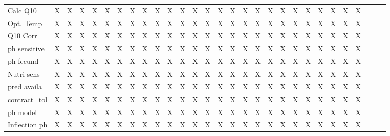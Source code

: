 \documentclass[11pt]{article}
\begin{document}
\begin{center}
\begin{tabular}{lllllllllllllllllllllllllllll}
 Calc Q10            &  X    &  X    &  X    &  X    &  X    &  X    &  X    &  X    &  X    &  X    &  X    &  X    &  X    &  X    &  X    &  X    &  X    &  X    &  X    &  X    &  X    &  X   &  X   &  X    &  X    &      &      &      \\
 Opt. Temp           &  X    &  X    &  X    &  X    &  X    &  X    &  X    &  X    &  X    &  X    &  X    &  X    &  X    &  X    &  X    &  X    &  X    &  X    &  X    &  X    &  X    &  X   &  X   &  X    &  X    &      &      &      \\
 Q10 Corr            &  X    &  X    &  X    &  X    &  X    &  X    &  X    &  X    &  X    &  X    &  X    &  X    &  X    &  X    &  X    &  X    &  X    &  X    &  X    &  X    &  X    &  X   &  X   &  X    &  X    &      &      &      \\
 ph sensitive        &  X    &  X    &  X    &  X    &  X    &  X    &  X    &  X    &  X    &  X    &  X    &  X    &  X    &  X    &  X    &  X    &  X    &  X    &  X    &  X    &  X    &  X   &  X   &  X    &  X    &      &      &      \\
 ph fecund           &  X    &  X    &  X    &  X    &  X    &  X    &  X    &  X    &  X    &  X    &  X    &  X    &  X    &  X    &  X    &  X    &  X    &  X    &  X    &  X    &  X    &  X   &  X   &  X    &  X    &      &      &      \\
 Nutri sens          &  X    &  X    &  X    &  X    &  X    &  X    &  X    &  X    &  X    &  X    &  X    &  X    &  X    &  X    &  X    &  X    &  X    &  X    &  X    &  X    &  X    &  X   &  X   &  X    &  X    &      &      &      \\
 pred availa         &  X    &  X    &  X    &  X    &  X    &  X    &  X    &  X    &  X    &  X    &  X    &  X    &  X    &  X    &  X    &  X    &  X    &  X    &  X    &  X    &  X    &  X   &  X   &  X    &  X    &      &      &      \\
 contract_tol        &  X    &  X    &  X    &  X    &  X    &  X    &  X    &  X    &  X    &  X    &  X    &  X    &  X    &  X    &  X    &  X    &  X    &  X    &  X    &  X    &  X    &  X   &  X   &  X    &  X    &      &      &      \\
 ph model            &  X    &  X    &  X    &  X    &  X    &  X    &  X    &  X    &  X    &  X    &  X    &  X    &  X    &  X    &  X    &  X    &  X    &  X    &  X    &  X    &  X    &  X   &  X   &  X    &  X    &      &      &      \\
 Inflection ph       &  X    &  X    &  X    &  X    &  X    &  X    &  X    &  X    &  X    &  X    &  X    &  X    &  X    &  X    &  X    &  X    &  X    &  X    &  X    &  X    &  X    &  X   &  X   &  X    &  X    &      &      &      \\

\end{tabular}
\end{center}
\end{document}
